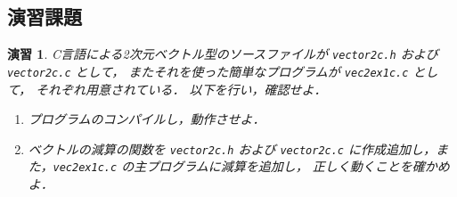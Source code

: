 \documentclass[11pt,a4,epsf]{jarticle}
\newtheorem{exerc}{演習}
\begin{document}
\subsection{演習課題}
\begin{exerc}%
C言語による2次元ベクトル型のソースファイルが
\verb+vector2c.h+ および \verb+vector2c.c+ として，
またそれを使った簡単なプログラムが \verb+vec2ex1c.c+ として，
それぞれ用意されている．
以下を行い，確認せよ．

\begin{enumerate}
\item[(1)] プログラムのコンパイルし，動作させよ．
\item[(2)] ベクトルの減算の関数を \verb+vector2c.h+ および \verb+vector2c.c+ に作成追加し，また，\verb+vec2ex1c.c+ の主プログラムに減算を追加し，
正しく動くことを確かめよ．


\end{enumerate}

\end{exerc} %

\end{document}

